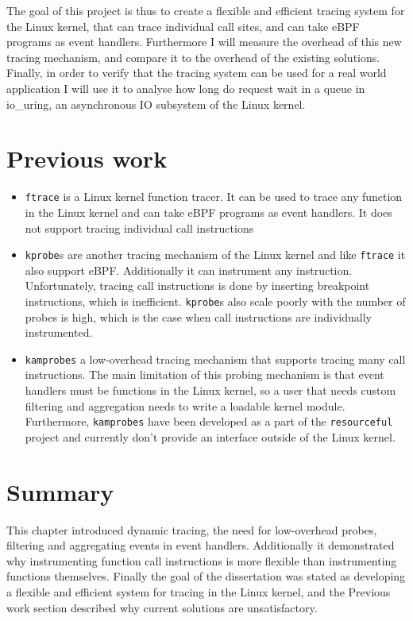 \documentclass[12pt,twoside,notitlepage]{report}
\begin{document}
		The goal of this project is thus to create a flexible and efficient tracing system for the Linux kernel, that can trace individual call sites, and can take eBPF programs as event handlers. Furthermore I will measure the overhead of this new tracing mechanism, and compare it to the overhead of the existing solutions. Finally, in order to verify that the tracing system can be used for a real world application I will use it to analyse how long do request wait in a queue in io\_uring, an asynchronous IO subsystem of the Linux kernel.

    \section{Previous work}
		\begin{itemize}
			\item \texttt{ftrace} is a Linux kernel function tracer. It can be used to trace any function in the Linux kernel and can take eBPF programs as event handlers. It does not support tracing individual call instructions

			\item \texttt{kprobe}s are another tracing mechanism of the Linux kernel and like \texttt{ftrace} it also support eBPF. Additionally it can instrument any instruction. Unfortunately, tracing call instructions is done by inserting breakpoint instructions, which is inefficient. \texttt{kprobe}s also scale poorly with the number of probes is high, which is the case when call instructions are individually instrumented.

			\item \texttt{kamprobes} a low-overhead tracing mechanism that supports tracing many call instructions. The main limitation of this probing mechanism is that event handlers must be functions in the Linux kernel, so a user that needs custom filtering and aggregation needs to write a loadable kernel module. Furthermore, \texttt{kamprobes} have been developed as a part of the \texttt{resourceful} project and currently don't provide an interface outside of the Linux kernel.
		\end{itemize}

	\section{Summary}

		This chapter introduced dynamic tracing, the need for low-overhead probes, filtering and aggregating events in event handlers. Additionally it demonstrated why instrumenting function call instructions is more flexible than instrumenting functions themselves. Finally the goal of the dissertation was stated as developing a flexible and efficient system for tracing in the Linux kernel, and the Previous work section described why current solutions are unsatisfactory.
\end{document}
